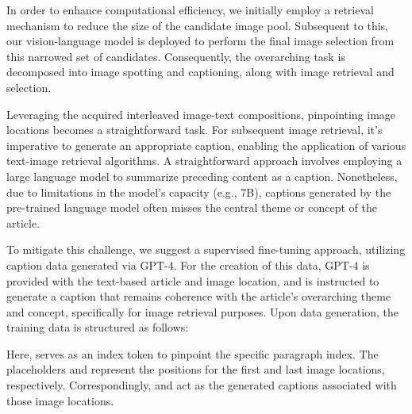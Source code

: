 \documentclass[10pt,twocolumn,letterpaper]{article}
\begin{document}
In order to enhance computational efficiency, we initially employ a retrieval mechanism to reduce the size of the candidate image pool. Subsequent to this, our vision-language model is deployed to perform the final image selection from this narrowed set of candidates. Consequently, the overarching task is decomposed into image spotting and captioning, along with image retrieval and selection.

Leveraging the acquired interleaved image-text compositions, pinpointing image locations becomes a straightforward task. For subsequent image retrieval, it's imperative to generate an appropriate caption, enabling the application of various text-image retrieval algorithms. A straightforward approach involves employing a large language model to summarize preceding content as a caption. Nonetheless, due to limitations in the model's capacity (e.g., 7B), captions generated by the pre-trained language model often misses the central theme or concept of the article. 


To mitigate this challenge, we suggest a supervised fine-tuning approach, utilizing caption data generated via GPT-4. For the creation of this data, GPT-4 is provided with the text-based article and image location, and is instructed to generate a caption that remains coherence with the article's overarching theme and concept, specifically for image retrieval purposes. Upon data generation, the training data is structured as follows:

Here,  serves as an index token to pinpoint the specific paragraph index. The placeholders  and  represent the positions for the first and last image locations, respectively. Correspondingly,  and  act as the generated captions associated with those image locations.
\end{document}
